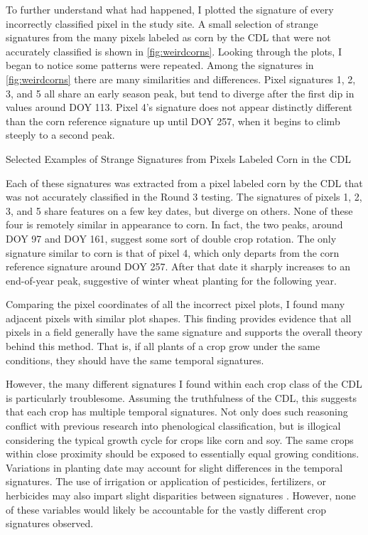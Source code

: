 To further understand what had happened, I plotted the signature of every incorrectly classified pixel in the study site. A small selection of strange signatures from the many pixels labeled as corn by the CDL that were not accurately classified is shown in \cref{fig:weirdcorns}. Looking through the plots, I began to notice some patterns were repeated. Among the signatures in \cref{fig:weirdcorns} there are many similarities and differences. Pixel signatures 1, 2, 3, and 5 all share an early season peak, but tend to diverge after the first dip in values around DOY 113. Pixel 4's signature does not appear distinctly different than the corn reference signature up until DOY 257, when it begins to climb steeply to a second peak.

\begin{ssfigure}
  \centering
  
  \caption{Selected Examples of Strange Signatures from Pixels Labeled Corn in the CDL}
  \label{fig:weirdcorns}
  \medskip
  \small
  Each of these signatures was extracted from a pixel labeled corn by the CDL that was not accurately classified in the Round 3 testing. The signatures of pixels 1, 2, 3, and 5 share features on a few key dates, but diverge on others. None of these four is remotely similar in appearance to corn. In fact, the two peaks, around DOY 97 and DOY 161, suggest some sort of double crop rotation. The only signature similar to corn is that of pixel 4, which only departs from the corn reference signature around DOY 257. After that date it sharply increases to an end-of-year peak, suggestive of winter wheat planting for the following year.
\end{ssfigure}

Comparing the pixel coordinates of all the incorrect pixel plots, I found many adjacent pixels with similar plot shapes. This finding provides evidence that all pixels in a field generally have the same signature and supports the overall theory behind this method. That is, if all plants of a crop grow under the same conditions, they should have the same temporal signatures.

However, the many different signatures I found within each crop class of the CDL is particularly troublesome. Assuming the truthfulness of the CDL, this suggests that each crop has multiple temporal signatures. Not only does such reasoning conflict with previous research into phenological classification, but is illogical considering the typical growth cycle for crops like corn and soy. The same crops within close proximity should be exposed to essentially equal growing conditions. Variations in planting date may account for slight differences in the temporal signatures. The use of irrigation or application of pesticides, fertilizers, or herbicides may also impart slight disparities between signatures \autocites{wardlow2005state-level}{wardlow2007analysis}{wardlow2008large-area}{sakamoto2010a-two-step}. However, none of these variables would likely be accountable for the vastly different crop signatures observed.

